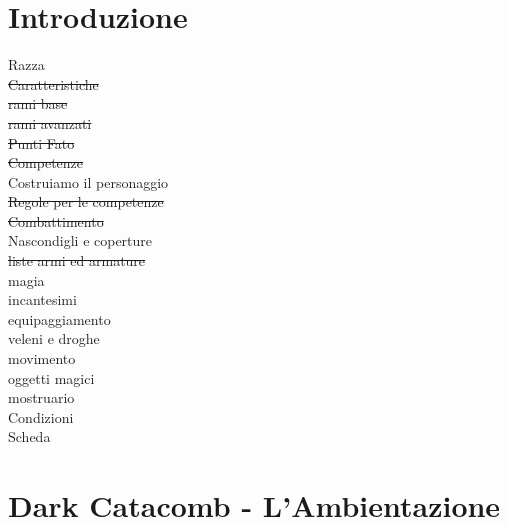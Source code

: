 \documentclass[12pt,a4paper,twoside,openany]{book}
\begin{document}







\section{Introduzione}
Razza\\
\sout{Caratteristiche}\\
\sout{rami base}\\
\sout{rami avanzati}\\
\sout{Punti Fato}\\
\sout{Competenze}\\
Costruiamo il personaggio\\
\sout{Regole per le competenze}\\
\sout{Combattimento}\\
Nascondigli e coperture\\
\sout{liste armi ed armature}\\
magia\\
incantesimi\\
equipaggiamento\\
veleni e droghe\\
movimento\\
oggetti magici\\
mostruario\\
Condizioni\\
Scheda\\

\pagebreak

\section{Dark Catacomb - L'Ambientazione}
\end{document}
